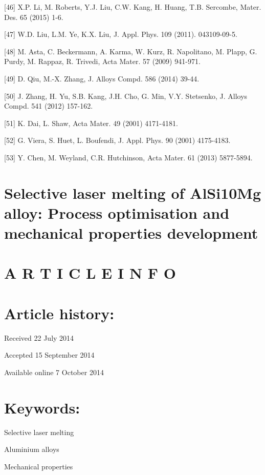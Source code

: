 \documentclass[10pt]{article}
\begin{document}
[46] X.P. Li, M. Roberts, Y.J. Liu, C.W. Kang, H. Huang, T.B. Sercombe, Mater. Des. 65 (2015) 1-6.

[47] W.D. Liu, L.M. Ye, K.X. Liu, J. Appl. Phys. 109 (2011). 043109-09-5.

[48] M. Asta, C. Beckermann, A. Karma, W. Kurz, R. Napolitano, M. Plapp, G. Purdy, M. Rappaz, R. Trivedi, Acta Mater. 57 (2009) 941-971.

[49] D. Qiu, M.-X. Zhang, J. Alloys Compd. 586 (2014) 39-44.

[50] J. Zhang, H. Yu, S.B. Kang, J.H. Cho, G. Min, V.Y. Stetsenko, J. Alloys Compd. 541 (2012) 157-162.

[51] K. Dai, L. Shaw, Acta Mater. 49 (2001) 4171-4181.

[52] G. Viera, S. Huet, L. Boufendi, J. Appl. Phys. 90 (2001) 4175-4183.

[53] Y. Chen, M. Weyland, C.R. Hutchinson, Acta Mater. 61 (2013) 5877-5894.

\section*{Selective laser melting of AlSi10Mg alloy: Process optimisation and mechanical properties development }


\section*{A R T I C L E I N F O}
\section*{Article history:}
Received 22 July 2014

Accepted 15 September 2014

Available online 7 October 2014

\section*{Keywords:}
Selective laser melting

Aluminium alloys

Mechanical properties
\end{document}

